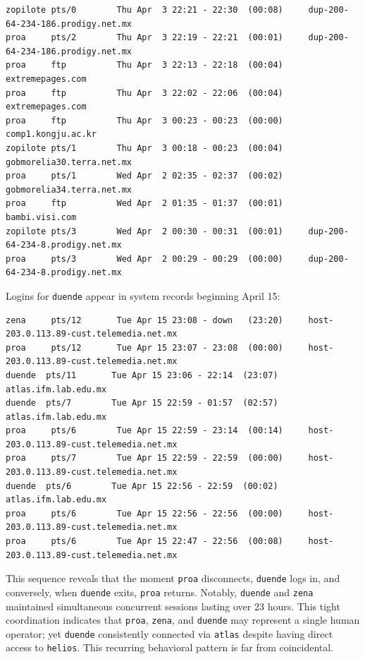 \begin{lstlisting}[style=terminal]
zopilote pts/0        Thu Apr  3 22:21 - 22:30  (00:08)     dup-200-64-234-186.prodigy.net.mx
proa     pts/2        Thu Apr  3 22:19 - 22:21  (00:01)     dup-200-64-234-186.prodigy.net.mx
proa     ftp          Thu Apr  3 22:13 - 22:18  (00:04)     extremepages.com
proa     ftp          Thu Apr  3 22:02 - 22:06  (00:04)     extremepages.com
proa     ftp          Thu Apr  3 00:23 - 00:23  (00:00)     comp1.kongju.ac.kr
zopilote pts/1        Thu Apr  3 00:18 - 00:23  (00:04)     gobmorelia30.terra.net.mx
proa     pts/1        Wed Apr  2 02:35 - 02:37  (00:02)     gobmorelia34.terra.net.mx
proa     ftp          Wed Apr  2 01:35 - 01:37  (00:01)     bambi.visi.com
zopilote pts/3        Wed Apr  2 00:30 - 00:31  (00:01)     dup-200-64-234-8.prodigy.net.mx
proa     pts/3        Wed Apr  2 00:29 - 00:29  (00:00)     dup-200-64-234-8.prodigy.net.mx
\end{lstlisting}

\vspace{1em}

 Logins for \texttt{duende} appear in system records beginning April 15: 

\vspace{1em}

\begin{lstlisting}[style=terminal]
zena     pts/12       Tue Apr 15 23:08 - down   (23:20)     host-203.0.113.89-cust.telemedia.net.mx
proa     pts/12       Tue Apr 15 23:07 - 23:08  (00:00)     host-203.0.113.89-cust.telemedia.net.mx
duende  pts/11       Tue Apr 15 23:06 - 22:14  (23:07)     atlas.ifm.lab.edu.mx
duende  pts/7        Tue Apr 15 22:59 - 01:57  (02:57)     atlas.ifm.lab.edu.mx
proa     pts/6        Tue Apr 15 22:59 - 23:14  (00:14)     host-203.0.113.89-cust.telemedia.net.mx
proa     pts/7        Tue Apr 15 22:59 - 22:59  (00:00)     host-203.0.113.89-cust.telemedia.net.mx
duende  pts/6        Tue Apr 15 22:56 - 22:59  (00:02)     atlas.ifm.lab.edu.mx
proa     pts/6        Tue Apr 15 22:56 - 22:56  (00:00)     host-203.0.113.89-cust.telemedia.net.mx
proa     pts/6        Tue Apr 15 22:47 - 22:56  (00:08)     host-203.0.113.89-cust.telemedia.net.mx
\end{lstlisting}

\vspace{1em}

This sequence reveals that the moment \texttt{proa} disconnects, \texttt{duende} logs in, and conversely, when \texttt{duende} exits, \texttt{proa} returns. Notably, \texttt{duende} and \texttt{zena} maintained simultaneous concurrent sessions lasting over 23 hours. This tight coordination indicates that \texttt{proa}, \texttt{zena}, and \texttt{duende} may represent a single human operator; yet \texttt{duende} consistently connected via \texttt{atlas} despite having direct access to \texttt{helios}. This recurring behavioral pattern is far from coincidental.

